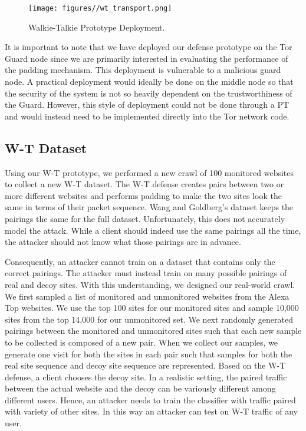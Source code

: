 \documentclass[USenglish,oneside,twocolumn]{article}
\begin{document}
\begin{figure}[tbp]
	\centering
    \texttt{[image: figures//wt\_transport.png]}
    \caption{Walkie-Talkie Prototype Deployment.}
    \label{transport}
    \vskip -0.3cm
\end{figure}


It is important to note that we have deployed our defense prototype on the Tor Guard node since we are primarily interested in evaluating the performance of the padding mechanism. This deployment is vulnerable to a malicious guard node. A practical deployment would ideally be done on the middle node so that the security of the system is not so heavily dependent on the trustworthiness of the Guard. However, this style of deployment could not be done through a PT and would instead need to be implemented directly into the Tor network code.

\subsection{W-T Dataset}

Using our W-T prototype, we performed a new crawl of 100 monitored websites to collect a new W-T dataset. The W-T defense creates pairs between two or more different websites and performs padding to make the two sites look the same in terms of their packet sequence. Wang and Goldberg's dataset keeps the pairings the same for the full dataset. Unfortunately, this does not accurately model the attack. While a client should indeed use the same pairings all the time, the attacker should not know what those pairings are in advance.

Consequently, an attacker cannot train on a dataset that contains only the correct pairings. The attacker must instead train on many possible pairings of real and decoy sites. With this understanding, we designed our real-world crawl. We first sampled a list of monitored and unmonitored websites from the Alexa Top websites. We use the top 100 sites for our monitored sites and sample 10,000 sites from the top 14,000 for our unmonitored set. We next randomly generated pairings between the monitored and unmonitored sites such that each new sample to be collected is composed of a new pair. When we collect our samples, we generate one visit for both the sites in each pair such that samples for both the real site sequence and decoy site sequence are represented. Based on the W-T defense, a client chooses the decoy site. In a realistic setting, the paired traffic between the actual website and the decoy can be variously different among different users. Hence, an attacker needs to train the classifier with traffic paired with variety of other sites. In this way an attacker can test on W-T traffic of any user.
\end{document}
